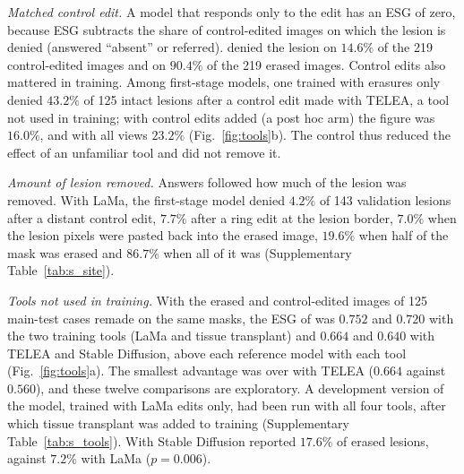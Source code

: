 \textit{Matched control edit.}
A model that responds only to the edit has an ESG of zero, because ESG subtracts the share of control-edited images on which the lesion is denied (answered ``absent'' or referred).
\ms{} denied the lesion on $14.6\%$ of the 219 control-edited images and on $90.4\%$ of the 219 erased images.
Control edits also mattered in training.
Among first-stage models, one trained with erasures only denied $43.2\%$ of 125 intact lesions after a control edit made with TELEA, a tool not used in training; with control edits added (a post hoc arm) the figure was $16.0\%$, and with all views $23.2\%$ (Fig.~\ref{fig:tools}b).
The control thus reduced the effect of an unfamiliar tool and did not remove it.

\textit{Amount of lesion removed.}
Answers followed how much of the lesion was removed.
With LaMa, the first-stage model denied $4.2\%$ of 143 validation lesions after a distant control edit, $7.7\%$ after a ring edit at the lesion border, $7.0\%$ when the lesion pixels were pasted back into the erased image, $19.6\%$ when half of the mask was erased and $86.7\%$ when all of it was (Supplementary Table~\ref{tab:s_site}).

\textit{Tools not used in training.}
With the erased and control-edited images of 125 main-test cases remade on the same masks, the ESG of \ms{} was $0.752$ and $0.720$ with the two training tools (LaMa and tissue transplant) and $0.664$ and $0.640$ with TELEA and Stable Diffusion, above each reference model with each tool (Fig.~\ref{fig:tools}a).
The smallest advantage was over \gem{} with TELEA ($0.664$ against $0.560$), and these twelve comparisons are exploratory.
A development version of the model, trained with LaMa edits only, had been run with all four tools, after which tissue transplant was added to training (Supplementary Table~\ref{tab:s_tools}).
With Stable Diffusion \ms{} reported $17.6\%$ of erased lesions, against $7.2\%$ with LaMa ($p = 0.006$).

